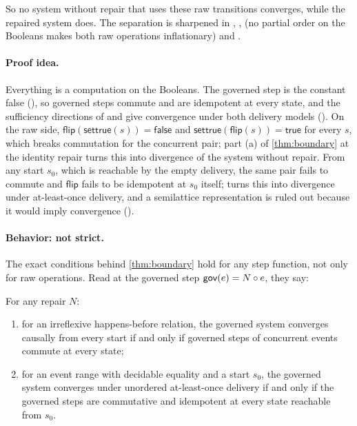 So no system without repair that uses these raw transitions converges, while the repaired system
does. The separation is sharpened in , ,
 (no partial order on the Booleans makes both raw operations
inflationary) and .

\paragraph{Proof idea.}
Everything is a computation on the Booleans. The governed step is the constant \textsf{false}
(), so governed steps commute and are idempotent at every state, and the sufficiency
directions of  and  give convergence under both
delivery models (). On the raw side, $\mathsf{flip}(\mathsf{settrue}(s))
= \textsf{false}$ and $\mathsf{settrue}(\mathsf{flip}(s)) = \textsf{true}$ for every $s$, which breaks
commutation for the concurrent pair; part (a) of \cref{thm:boundary} at the identity repair turns this
into divergence of the system without repair. From any start $s_0$, which is reachable by the empty
delivery, the same pair fails to commute and $\mathsf{flip}$ fails to be idempotent at $s_0$ itself;
 turns this into divergence under at-least-once delivery, and a semilattice
representation is ruled out because it would imply convergence ().

\paragraph{Behavior: not strict.}
The exact conditions behind \cref{thm:boundary} hold for any step function, not only for raw
operations. Read at the governed step $\mathsf{gov}(e) = N \circ e$, they say:

\begin{corollary}\label{cor:behavior}
For any repair $N$:
\begin{enumerate}[label=(\alph*)]
  \item for an irreflexive happens-before relation, the governed system converges causally from
    every start if and only if governed steps of concurrent events commute at every state;
  \item for an event range with decidable equality and a start $s_0$, the governed system converges
    under unordered at-least-once delivery if
    and only if the governed steps are commutative and idempotent at every state reachable from
    $s_0$.
\end{enumerate}
\end{corollary}

